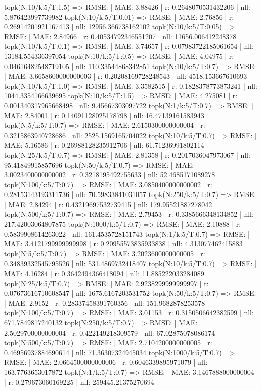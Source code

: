 topk(N:10/k:5/T:1.5) => RMSE: | MAE: 3.88426 | r: 0.2648070531432206 | nll: 5.876423997739982
topk(N:10/k:5/T:0.01) => RMSE: | MAE: 2.76856 | r: 0.26914201921167413 | nll: 12956.366738162102
topk(N:10/k:5/T:0.05) => RMSE: | MAE: 2.84966 | r: 0.40534792346551207 | nll: 11656.006412248378
topk(N:10/k:5/T:0.1) => RMSE: | MAE: 3.74657 | r: 0.07983722185061654 | nll: 13184.554336397054
topk(N:10/k:5/T:0.5) => RMSE: | MAE: 4.04975 | r: 0.04616482548719105 | nll: 110.33544868342851
topk(N:10/k:5/T:0.7) => RMSE: | MAE: 3.6658600000000003 | r: 0.20208169728248543 | nll: 4518.153667610693
topk(N:10/k:5/T:1.0) => RMSE: | MAE: 3.3582515 | r: 0.1828378773873241 | nll: 1044.3354166639695
topk(N:10/k:5/T:1.5) => RMSE: | MAE: 4.275081 | r: 0.001340317965668498 | nll: 9.45667303097722
topk(N:1/k:5/T:0.7) => RMSE: | MAE: 2.84001 | r: 0.14091128025178798 | nll: 16.47139161583943
topk(N:5/k:5/T:0.7) => RMSE: | MAE: 2.6150300000000004 | r: 0.3215863940728686 | nll: 2525.1569165704022
topk(N:10/k:5/T:0.7) => RMSE: | MAE: 5.16586 | r: 0.26988128235912706 | nll: 61.71236991802114
topk(N:25/k:5/T:0.7) => RMSE: | MAE: 2.81358 | r: 0.2017036047973067 | nll: 95.41849915857696
topk(N:50/k:5/T:0.7) => RMSE: | MAE: 3.0023400000000002 | r: 0.3218195492755633 | nll: 52.4685171089278
topk(N:100/k:5/T:0.7) => RMSE: | MAE: 3.0850400000000002 | r: 0.28153143193311736 | nll: 70.59833841031057
topk(N:250/k:5/T:0.7) => RMSE: | MAE: 2.84294 | r: 0.43219697532739415 | nll: 179.95521887278042
topk(N:500/k:5/T:0.7) => RMSE: | MAE: 2.79453 | r: 0.3385666348134852 | nll: 217.42003064807875
topk(N:1000/k:5/T:0.7) => RMSE: | MAE: 2.10888 | r: 0.5839908614263022 | nll: 161.4535728151743
topk(N:1/k:5/T:0.7) => RMSE: | MAE: 3.4121799999999998 | r: 0.20955573835933838 | nll: 4.313077462415883
topk(N:5/k:5/T:0.7) => RMSE: | MAE: 3.2023600000000005 | r: 0.34839332545795526 | nll: 531.4869732418407
topk(N:10/k:5/T:0.7) => RMSE: | MAE: 4.16284 | r: 0.3642494366418094 | nll: 11.885222033284089
topk(N:25/k:5/T:0.7) => RMSE: | MAE: 2.9238299999999997 | r: 0.07673616710608547 | nll: 1675.6167203531752
topk(N:50/k:5/T:0.7) => RMSE: | MAE: 2.9152 | r: 0.28337458391760356 | nll: 151.9682878253578
topk(N:100/k:5/T:0.7) => RMSE: | MAE: 3.01153 | r: 0.3150506642382599 | nll: 671.7849817240132
topk(N:250/k:5/T:0.7) => RMSE: | MAE: 2.5029700000000004 | r: 0.422149218309579 | nll: 67.02875078086174
topk(N:500/k:5/T:0.7) => RMSE: | MAE: 2.7104200000000005 | r: 0.46956937884690614 | nll: 71.36307324945034
topk(N:1000/k:5/T:0.7) => RMSE: | MAE: 2.0664500000000006 | r: 0.6046339895971079 | nll: 163.7763653017872
topk(N:1/k:5/T:0.7) => RMSE: | MAE: 3.1467888000000004 | r: 0.279673060169225 | nll: 259445.21375270694
